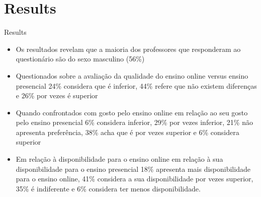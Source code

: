 \documentclass[10pt]{beamer}
\begin{document}
\section{Results}

\begin{frame}[fragile]{Results}
  	\begin{itemize}
		\item Os resultados revelam que a maioria dos professores que responderam ao questionário são do sexo masculino (56\%)
		\item Questionados sobre a avaliação da qualidade do ensino online versus ensino presencial 24\% considera que é inferior, 44\% refere que não existem diferenças e 26\% por vezes é superior
		\item Quando confrontados com gosto pelo ensino online em relação ao seu gosto pelo ensino presencial 6\% considera inferior, 29\% por vezes inferior, 21\% não apresenta preferência, 38\% acha que é por vezes superior e 6\% considera superior
		\item Em relação à disponibilidade para o ensino online em relação à sua disponibilidade para o ensino presencial 18\% apresenta mais disponibilidade para o ensino online, 41\% considera a sua disponibilidade por vezes superior, 35\% é indiferente e 6\% considera ter menos disponibilidade.
	\end{itemize}
\end{frame}
\end{document}
